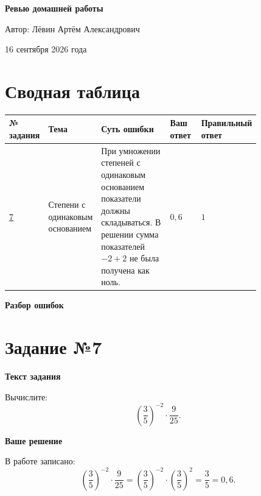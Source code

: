 \documentclass[12pt,a4paper]{article}
\begin{document}
\begin{titlepage}
\centering
\vspace*{0.28\textheight}
{\LARGE\bfseries Ревью домашней работы\par}
\vspace{2.2cm}
{\large Автор: Лёвин Артём Александрович\par}
\vspace{0.8cm}
{\large 16 сентября 2026 года\par}
\vfill
{}
\end{titlepage}

\newpage
\section*{Сводная таблица}
\small
\begin{tabular}{>{\centering\arraybackslash}p{0.07\linewidth} p{0.18\linewidth} p{0.31\linewidth} p{0.13\linewidth} p{0.13\linewidth}}
\toprule
№ задания & Тема & Суть ошибки & Ваш ответ & Правильный ответ \\
\midrule
\hyperref[task:7]{7} & Степени с одинаковым основанием & При умножении степеней с одинаковым основанием показатели должны складываться. В решении сумма показателей $-2+2$ не была получена как ноль. & $0{,}6$ & $1$ \\
\bottomrule
\end{tabular}
\normalsize

\newpage
\vspace*{\fill}
\begin{center}
{\LARGE\bfseries Разбор ошибок}
\end{center}
\vspace*{\fill}

\newpage
{}\label{task:7}
\section*{Задание №7}

\textbf{Текст задания}

Вычислите:
\[
\left(\frac{3}{5}\right)^{-2}\cdot\frac{9}{25}.
\]

\textbf{Ваше решение}

В работе записано:
\[
\left(\frac{3}{5}\right)^{-2}\cdot\frac{9}{25}
=
\left(\frac{3}{5}\right)^{-2}\cdot\left(\frac{3}{5}\right)^2
=
\frac{3}{5}
=
0{,}6.
\]
\end{document}

